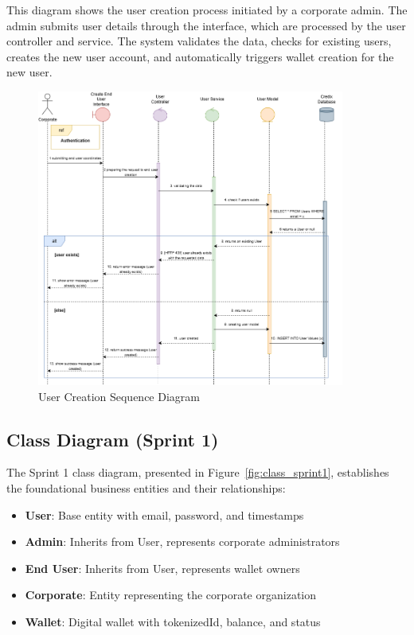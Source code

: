 This diagram shows the user creation process initiated by a corporate admin. The admin submits user details through the interface, which are processed by the user controller and service. The system validates the data, checks for existing users, creates the new user account, and automatically triggers wallet creation for the new user.

\begin{figure}[H]
\centering
\includegraphics[width=0.9\textwidth]{images/seq_user_creation.png}
\caption{User Creation Sequence Diagram}
\label{fig:seq_user_creation}
\end{figure}

\subsection{Class Diagram (Sprint 1)}

The Sprint 1 class diagram, presented in Figure~\ref{fig:class_sprint1}, establishes the foundational business entities and their relationships:

\begin{itemize}[nosep,leftmargin=*]
\item \textbf{User}: Base entity with email, password, and timestamps
\item \textbf{Admin}: Inherits from User, represents corporate administrators
\item \textbf{End User}: Inherits from User, represents wallet owners
\item \textbf{Corporate}: Entity representing the corporate organization
\item \textbf{Wallet}: Digital wallet with tokenizedId, balance, and status
\end{itemize}

